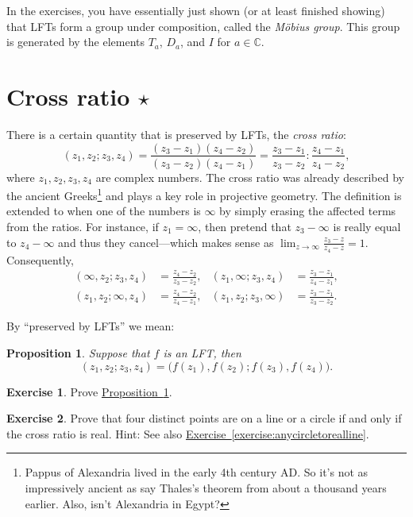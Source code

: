 \documentclass[12pt,openany]{book}
\newcommand{\C}{{\mathbb{C}}}
\newcommand{\myindex}[1]{#1\index{#1}}
\newcommand{\myquote}[1]{``#1''}
\theoremstyle{plain}
\newtheorem{prop}[thm]{Proposition}
\theoremstyle{remark}
\theoremstyle{definition}
\newenvironment{exbox}{%
    \def\FrameCommand{\vrule width 1pt \relax\hspace{10pt}}%
    \MakeFramed{\advance\hsize-\width\FrameRestore}%
}{%
    \endMakeFramed
}
\theoremstyle{exercise}
\newtheorem{exercise}{Exercise}[section]
\theoremstyle{example}
\newcommand{\exerciseref}[1]{\hyperref[#1]{Exercise~\ref*{#1}}}
\newcommand{\propref}[1]{\hyperref[#1]{Proposition~\ref*{#1}}}
\begin{document}
In the exercises, you have essentially just shown (or at least finished
showing) that LFTs form a group under composition,
called the \emph{\myindex{M\"obius group}}.
This group is generated by the elements
$T_a$, $D_a$, and $I$ for $a\in \C$.


\section{Cross ratio \texorpdfstring{$\star$}{*}}

There is a certain quantity that is preserved by LFTs, the
\emph{\myindex{cross ratio}}:
%
\begin{equation*}
(z_1,z_2;z_3,z_4)
=
\frac{(z_3-z_1)(z_4-z_2)}{(z_3-z_2)(z_4-z_1)}
=
\frac{z_3-z_1}{z_3-z_2} : 
\frac{z_4-z_1}{z_4-z_2} ,
\end{equation*}
where $z_1,z_2,z_3,z_4$ are complex numbers.  The cross ratio
was already described by the ancient Greeks\footnote{Pappus of Alexandria
lived in the early 4th century AD.  So it's not as impressively ancient as say
Thales's theorem from about a thousand years earlier.  Also, isn't
Alexandria in Egypt?}
and plays a key role in projective geometry.
The definition is extended to when one of the numbers is $\infty$ by simply
erasing the affected terms from the ratios.  For instance, if $z_1=\infty$,
then pretend that $z_3-\infty$
is really equal to $z_4-\infty$ and
thus they cancel---which makes sense as $\lim_{z\to\infty} \frac{z_3-z}{z_4-z} = 1$.
Consequently,
\begin{align*}
(\infty,z_2;z_3,z_4)
& =
\frac{z_4-z_2}{z_3-z_2}
,
&
(z_1,\infty;z_3,z_4)
& =
\frac{z_3-z_1}{z_4-z_1}
,
\\
(z_1,z_2;\infty,z_4)
& =
\frac{z_4-z_2}{z_4-z_1}
,
& 
(z_1,z_2;z_3,\infty)
& =
\frac{z_3-z_1}{z_3-z_2} .
\end{align*}

By \myquote{preserved by LFTs} we mean:

\begin{prop} \label{prop:crossratioinvariant}
Suppose that $f$ is an LFT, then
\begin{equation*}
(z_1,z_2;z_3,z_4) =
\bigl(f(z_1),f(z_2);f(z_3),f(z_4)\bigr) .
\end{equation*}
\end{prop}

\begin{exbox}
\begin{exercise}
Prove \propref{prop:crossratioinvariant}.
\end{exercise}

\begin{exercise}
Prove that four distinct points are on a line or a circle if and only if the cross
ratio is real.
Hint: See also \exerciseref{exercise:anycircletorealline}.
\end{exercise}
\end{exbox}
\end{document}
